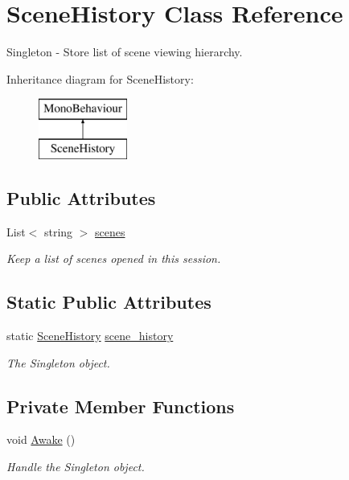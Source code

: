 \hypertarget{class_scene_history}{}\section{Scene\+History Class Reference}
\label{class_scene_history}


Singleton -\/ Store list of scene viewing hierarchy.  


Inheritance diagram for Scene\+History\+:\begin{figure}[H]
\begin{center}
\leavevmode
\includegraphics[height=2.000000cm]{class_scene_history}
\end{center}
\end{figure}
\subsection*{Public Attributes}
\begin{DoxyCompactItemize}
\item 
List$<$ string $>$ \mbox{\hyperlink{class_scene_history_a2795917d2bfcff8b698453e9ea474efc}{scenes}}
\begin{DoxyCompactList}\small\item\em Keep a list of scenes opened in this session. \end{DoxyCompactList}\end{DoxyCompactItemize}
\subsection*{Static Public Attributes}
\begin{DoxyCompactItemize}
\item 
static \mbox{\hyperlink{class_scene_history}{Scene\+History}} \mbox{\hyperlink{class_scene_history_a66d1fc693a99eb7055349244fa233868}{scene\+\_\+history}}
\begin{DoxyCompactList}\small\item\em The Singleton object. \end{DoxyCompactList}\end{DoxyCompactItemize}
\subsection*{Private Member Functions}
\begin{DoxyCompactItemize}
\item 
void \mbox{\hyperlink{class_scene_history_a514f50fbc863e0b0e3b93dbf88a40703}{Awake}} ()
\begin{DoxyCompactList}\small\item\em Handle the Singleton object. \end{DoxyCompactList}\end{DoxyCompactItemize}


